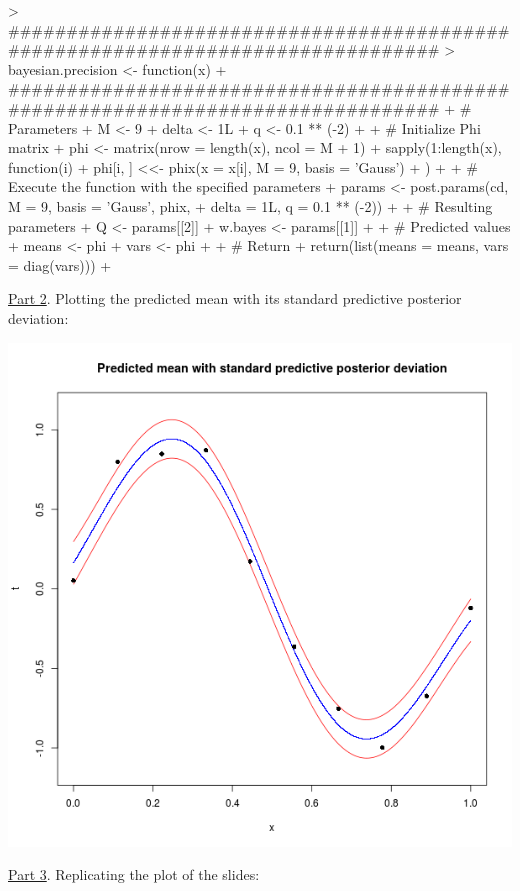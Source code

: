 \documentclass[a4paper, 11pt]{article}
\begin{document}
\begin{Schunk}
\begin{Sinput}
> ################################################################################
> bayesian.precision <- function(x) {
+ ################################################################################
+   # Parameters
+   M <- 9
+   delta <- 1L
+   q <- 0.1 ** (-2)
+   
+   # Initialize Phi matrix
+   phi <- matrix(nrow = length(x), ncol = M + 1)
+   sapply(1:length(x), function(i) {
+     phi[i, ] <<- phix(x = x[i], M = 9, basis = 'Gauss')
+   })
+   
+   # Execute the function with the specified parameters
+   params <- post.params(cd, M = 9, basis = 'Gauss', phix,
+                          delta = 1L, q = 0.1 ** (-2))
+   
+   # Resulting parameters
+   Q <- params[[2]]
+   w.bayes <- params[[1]]
+   
+   # Predicted values
+   means <- phi %
+   vars <- phi %
+   
+   # Return
+   return(list(means = means, vars = diag(vars)))
+ }
\end{Sinput}
\end{Schunk}
\underline{Part 2}. Plotting the predicted mean with its standard predictive posterior deviation:
\begin{center}
\includegraphics[scale=0.6]{ps2_plot3.png}
\end{center}
\underline{Part 3}. Replicating the plot of the slides:
\end{document}
